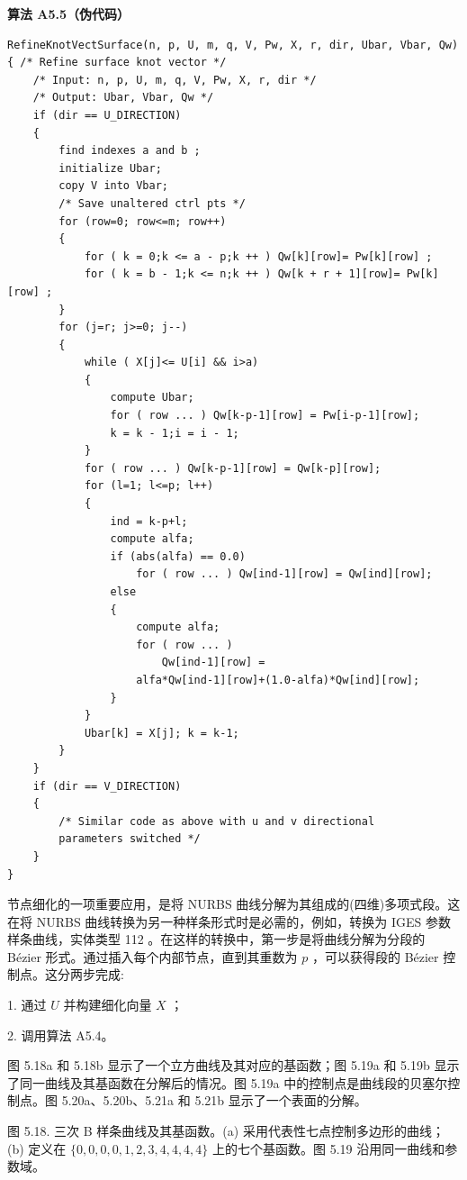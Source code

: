 \documentclass[../main.tex]{subfiles}
\begin{document}
\par\medskip\noindent\textbf{算法 A5.5（伪代码）}\par
\begin{verbatim}
RefineKnotVectSurface(n, p, U, m, q, V, Pw, X, r, dir, Ubar, Vbar, Qw)
{ /* Refine surface knot vector */
    /* Input: n, p, U, m, q, V, Pw, X, r, dir */
    /* Output: Ubar, Vbar, Qw */
    if (dir == U_DIRECTION)
    {
        find indexes a and b ;
        initialize Ubar;
        copy V into Vbar;
        /* Save unaltered ctrl pts */
        for (row=0; row<=m; row++)
        {
            for ( k = 0;k <= a - p;k ++ ) Qw[k][row]= Pw[k][row] ;
            for ( k = b - 1;k <= n;k ++ ) Qw[k + r + 1][row]= Pw[k][row] ;
        }
        for (j=r; j>=0; j--)
        {
            while ( X[j]<= U[i] && i>a)
            {
                compute Ubar;
                for ( row ... ) Qw[k-p-1][row] = Pw[i-p-1][row];
                k = k - 1;i = i - 1;
            }
            for ( row ... ) Qw[k-p-1][row] = Qw[k-p][row];
            for (l=1; l<=p; l++)
            {
                ind = k-p+l;
                compute alfa;
                if (abs(alfa) == 0.0)
                    for ( row ... ) Qw[ind-1][row] = Qw[ind][row];
                else
                {
                    compute alfa;
                    for ( row ... )
                        Qw[ind-1][row] =
                    alfa*Qw[ind-1][row]+(1.0-alfa)*Qw[ind][row];
                }
            }
            Ubar[k] = X[j]; k = k-1;
        }
    }
    if (dir == V_DIRECTION)
    {
        /* Similar code as above with u and v directional
        parameters switched */
    }
}
\end{verbatim}

节点细化的一项重要应用，是将 NURBS 曲线分解为其组成的(四维)多项式段。这在将 NURBS 曲线转换为另一种样条形式时是必需的，例如，转换为 IGES 参数样条曲线，实体类型 112 \cite{IGE93}。在这样的转换中，第一步是将曲线分解为分段的 Bézier 形式。通过插入每个内部节点，直到其重数为 \(p\) ，可以获得段的 Bézier 控制点。这分两步完成:

1. 通过 \(U\) 并构建细化向量 \(X\) ；

2. 调用算法 A5.4。

图 5.18a 和 5.18b 显示了一个立方曲线及其对应的基函数；图 5.19a 和 5.19b 显示了同一曲线及其基函数在分解后的情况。图 5.19a 中的控制点是曲线段的贝塞尔控制点。图 5.20a、5.20b、5.21a 和 5.21b 显示了一个表面的分解。

\begin{center}
\begin{minipage}{18cm}
\vspace*{.6\baselineskip}
\centering
{}
\par\smallskip
图 5.18. 三次 B 样条曲线及其基函数。(a) 采用代表性七点控制多边形的曲线；(b) 定义在 \(\{0,0,0,0,1,2,3,4,4,4,4\}\) 上的七个基函数。图 5.19 沿用同一曲线和参数域。
\end{minipage}
\end{center}
\end{document}
